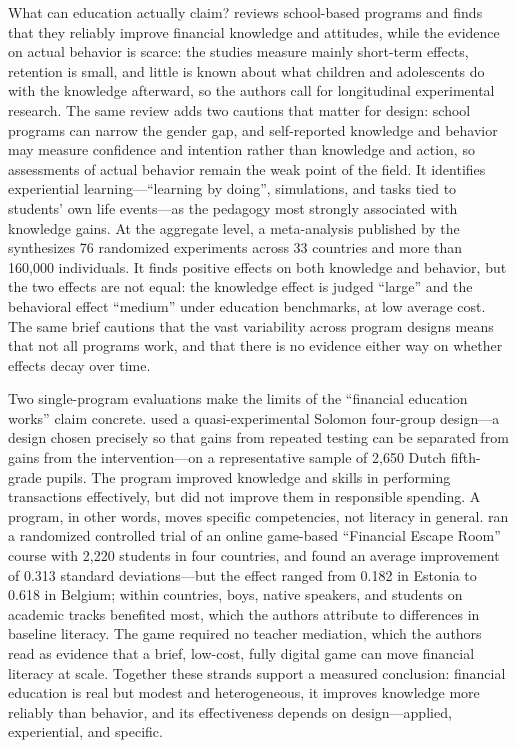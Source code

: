 What can education actually claim? \textcite{amagir2017review} reviews
school-based programs and finds that they reliably improve financial
knowledge and attitudes, while the evidence on actual behavior is scarce:
the studies measure mainly short-term effects, retention is small, and little
is known about what children and adolescents do with the knowledge afterward,
so the authors call for longitudinal experimental research. The same review adds
two cautions that matter for design: school programs can narrow the gender
gap, and self-reported knowledge and behavior may measure confidence and
intention rather than knowledge and action, so assessments of actual behavior
remain the weak point of the field. It identifies experiential learning---\enquote{learning by doing}, simulations,
and tasks tied to students' own life events---as the pedagogy most strongly
associated with knowledge gains. At the aggregate level, a meta-analysis
published by the \textcite{finrafoundation2022financial} synthesizes 76
randomized experiments across 33 countries and more than 160,000 individuals.
It finds positive effects on both knowledge and behavior, but the two effects
are not equal: the knowledge effect is judged \enquote{large} and the
behavioral effect \enquote{medium} under education benchmarks, at low average
cost. The same brief cautions that the vast variability across program designs
means that not all programs work, and that there is no evidence either way on
whether effects decay over time.

Two single-program evaluations make the limits of the \enquote{financial
education works} claim concrete. \textcite{dare2020effect} used a
quasi-experimental Solomon four-group design---a design chosen precisely so
that gains from repeated testing can be separated from gains from the
intervention---on a representative sample of 2,650 Dutch fifth-grade pupils.
The program improved knowledge and skills in performing transactions
effectively, but did not improve them in responsible spending. A program, in
other words, moves specific competencies, not literacy in general.
\textcite{cannistra2024impact} ran a randomized controlled trial of an online
game-based \enquote{Financial Escape Room} course with 2,220 students in four
countries, and found an average improvement of 0.313 standard deviations---but
the effect ranged from 0.182 in Estonia to 0.618 in Belgium; within countries, boys, native
speakers, and students on academic tracks benefited most, which the authors
attribute to differences in baseline literacy. The game required no teacher
mediation, which the authors read as evidence that a brief, low-cost,
fully digital game can move financial literacy at scale. Together these
strands support a measured conclusion: financial education is real but
modest and heterogeneous, it improves knowledge more reliably than behavior,
and its effectiveness depends on design---applied, experiential, and specific.

